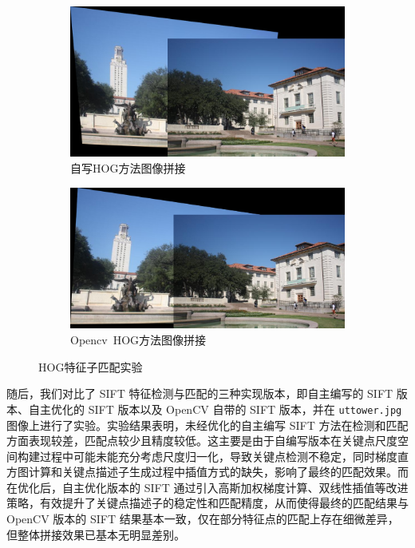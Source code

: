 \documentclass[a4paper, utf8]{ctexart}
\begin{document}
\begin{figure}[htbp]
		\begin{subfigure}{.45\textwidth}
			\centering
			\includegraphics[height=.13\textheight]{./figure/uttower_handon_stitching_hog.png}
			\caption{自写HOG方法图像拼接}
		\end{subfigure}
		\begin{subfigure}{.45\textwidth}
			\centering
			\includegraphics[height=.13\textheight]{./figure/uttower_opencv_stitching_hog.png}
			\caption{Opencv\ HOG方法图像拼接}
		\end{subfigure}
		\caption{HOG特征子匹配实验}
	\end{figure}

	随后，我们对比了 SIFT 特征检测与匹配的三种实现版本，即自主编写的 SIFT 版本、自主优化的 SIFT 版本以及 OpenCV 自带的 SIFT 版本，并在 \verb|uttower.jpg| 图像上进行了实验。实验结果表明，未经优化的自主编写 SIFT 方法在检测和匹配方面表现较差，匹配点较少且精度较低。这主要是由于自编写版本在关键点尺度空间构建过程中可能未能充分考虑尺度归一化，导致关键点检测不稳定，同时梯度直方图计算和关键点描述子生成过程中插值方式的缺失，影响了最终的匹配效果。而在优化后，自主优化版本的 SIFT 通过引入高斯加权梯度计算、双线性插值等改进策略，有效提升了关键点描述子的稳定性和匹配精度，从而使得最终的匹配结果与 OpenCV 版本的 SIFT 结果基本一致，仅在部分特征点的匹配上存在细微差异，但整体拼接效果已基本无明显差别。
	
\end{document}
